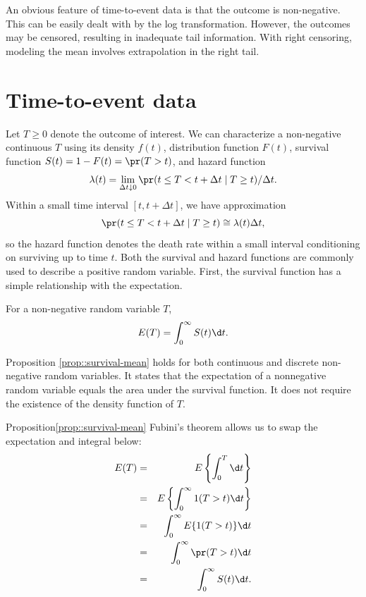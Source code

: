 An obvious feature of time-to-event data is that the outcome is non-negative. This can be easily dealt with by the log transformation. However, the outcomes may be censored, resulting in inadequate tail information. With right censoring, modeling the mean involves extrapolation in the right tail.  


\section{Time-to-event data}


Let $T\geq0$ denote the outcome of interest. We can characterize
a non-negative continuous $T$ using its density $f(t)$, distribution
function $F(t)$, survival function $S(t)=1-F(t)=\pr(T>t)$, and hazard
function
\[
\lambda(t)=\lim_{\Delta t\downarrow0}\pr(t\leq T<t+\Delta t\mid T\geq t)/\Delta t.
\]
Within a small time interval $[t,t+\Delta t]$, we have approximation
\[
\pr(t\leq T<t+\Delta t\mid T\geq t)\cong\lambda(t)\Delta t,
\]
so the hazard function denotes the death rate within a small interval conditioning on surviving up to time $t$.
Both the survival and hazard functions are commonly used to describe a positive random
variable. 
First, the survival function has a simple relationship with the expectation.

\begin{proposition}\label{prop::survival-mean}
For a non-negative random variable $T$,
$$
E(T) = \int_{0}^{\infty} S(t) \d t .
$$
\end{proposition}

Proposition \ref{prop::survival-mean} holds for both continuous and discrete non-negative random variables.
It states that the expectation of a nonnegative random variable equals the area under the survival function. It does not require the existence of the density function of $T$. 

\begin{myproof}{Proposition}{\ref{prop::survival-mean}}
Fubini's theorem allows us to swap the expectation and integral below:
\begin{eqnarray*}
E(T) &=& E \left\{  \int_0^{T}  \d t \right\}  \\
&=& E \left\{  \int_0^{\infty} 1(T > t) \d t \right\}  \\
&=&  \int_0^{\infty} E\{ 1(T > t)\}  \d t \\
&=& \int_0^{\infty} \pr (T > t)  \d t \\
&=& \int_{0}^{\infty} S(t) \d t .
\end{eqnarray*}
\end{myproof}


